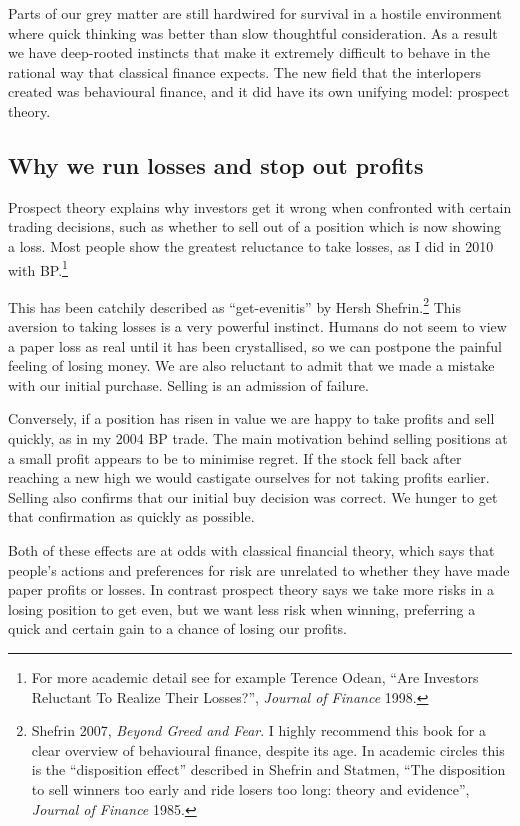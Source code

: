 Parts of our grey matter are still hardwired for survival in a hostile environment where quick thinking was better than slow thoughtful consideration. As a result we have deep-rooted instincts that make it extremely difficult to behave in the rational way that classical finance expects. The new field that the interlopers created was behavioural finance, and it did have its own unifying model: prospect theory.

\subsection*{Why we run losses and stop out profits}

Prospect theory explains why investors get it wrong when confronted with certain trading decisions, such as whether to sell out of a position which is now showing a loss. Most people show the greatest reluctance to take losses, as I did in 2010 with BP.\footnote{For more academic detail see for example Terence Odean, ``Are Investors Reluctant To Realize Their Losses?'', \textit{Journal of Finance} 1998.}

This has been catchily described as ``get-evenitis'' by Hersh Shefrin.\footnote{Shefrin 2007, \textit{Beyond Greed and Fear}. I highly recommend this book for a clear overview of behavioural finance, despite its age. In academic circles this is the ``disposition effect'' described in Shefrin and Statmen, ``The disposition to sell winners too early and ride losers too long: theory and evidence'', \textit{Journal of Finance} 1985.} This aversion to taking losses is a very powerful instinct. Humans do not seem to view a paper loss as real until it has been crystallised, so we can postpone the painful feeling of losing money. We are also reluctant to admit that we made a mistake with our initial purchase. Selling is an admission of failure.

Conversely, if a position has risen in value we are happy to take profits and sell quickly, as in my 2004 BP trade. The main motivation behind selling positions at a small profit appears to be to minimise regret. If the stock fell back after reaching a new high we would castigate ourselves for not taking profits earlier. Selling also confirms that our initial buy decision was correct. We hunger to get that confirmation as quickly as possible.

Both of these effects are at odds with classical financial theory, which says that people's actions and preferences for risk are unrelated to whether they have made paper profits or losses. In contrast prospect theory says we take more risks in a losing position to get even, but we want less risk when winning, preferring a quick and certain gain to a chance of losing our profits.

